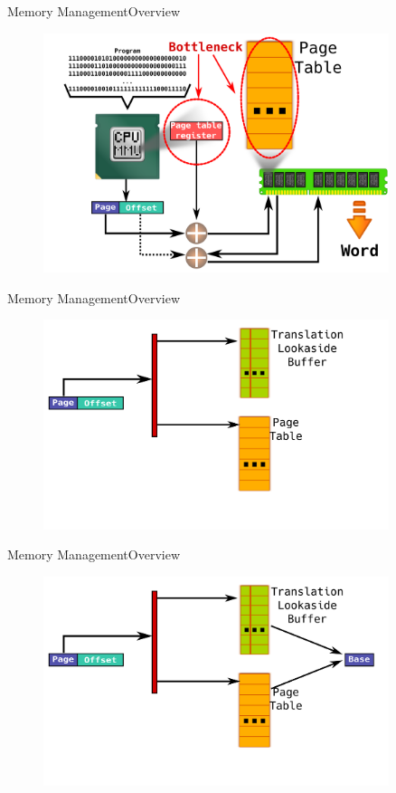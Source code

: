 \documentclass[10pt]{beamer}
\begin{document}
\begin{frame}{Memory Management}{Overview}
  \begin{figure}[ht]
    \centering
    \includegraphics[width=0.9\textwidth, keepaspectratio=true]{images/tlb_a.png}
  \end{figure}
\end{frame}

\begin{frame}{Memory Management}{Overview}
  \begin{figure}[ht]
    \centering
    \includegraphics[width=0.9\textwidth, keepaspectratio=true]{images/tlb_b.png}
  \end{figure}
\end{frame}

\begin{frame}{Memory Management}{Overview}
  \begin{figure}[ht]
    \centering
    \includegraphics[width=0.9\textwidth, keepaspectratio=true]{images/tlb_c.png}
  \end{figure}
\end{frame}
\end{document}

